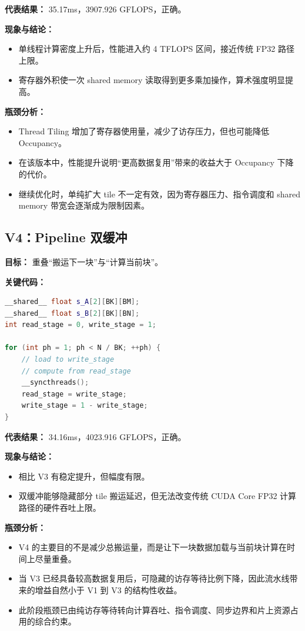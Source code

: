 \documentclass[12pt,a4paper]{ctexart}
\begin{document}
\textbf{代表结果：} 35.17ms，3907.926 GFLOPS，正确。

\textbf{现象与结论：}
\begin{itemize}[leftmargin=2em]
  \item 单线程计算密度上升后，性能进入约 4 TFLOPS 区间，接近传统 FP32 路径上限。
  \item 寄存器外积使一次 shared memory 读取得到更多乘加操作，算术强度明显提高。
\end{itemize}

\textbf{瓶颈分析：}
\begin{itemize}[leftmargin=2em]
  \item Thread Tiling 增加了寄存器使用量，减少了访存压力，但也可能降低 Occupancy。
  \item 在该版本中，性能提升说明“更高数据复用”带来的收益大于 Occupancy 下降的代价。
  \item 继续优化时，单纯扩大 tile 不一定有效，因为寄存器压力、指令调度和 shared memory 带宽会逐渐成为限制因素。
\end{itemize}

\subsection{V4：Pipeline 双缓冲}
\textbf{目标：} 重叠“搬运下一块”与“计算当前块”。

\textbf{关键代码：}
\begin{lstlisting}[language=C++]
__shared__ float s_A[2][BK][BM];
__shared__ float s_B[2][BK][BN];
int read_stage = 0, write_stage = 1;

for (int ph = 1; ph < N / BK; ++ph) {
    // load to write_stage
    // compute from read_stage
    __syncthreads();
    read_stage = write_stage;
    write_stage = 1 - write_stage;
}
\end{lstlisting}

\textbf{代表结果：} 34.16ms，4023.916 GFLOPS，正确。

\textbf{现象与结论：}
\begin{itemize}[leftmargin=2em]
  \item 相比 V3 有稳定提升，但幅度有限。
  \item 双缓冲能够隐藏部分 tile 搬运延迟，但无法改变传统 CUDA Core FP32 计算路径的硬件吞吐上限。
\end{itemize}

\textbf{瓶颈分析：}
\begin{itemize}[leftmargin=2em]
  \item V4 的主要目的不是减少总搬运量，而是让下一块数据加载与当前块计算在时间上尽量重叠。
  \item 当 V3 已经具备较高数据复用后，可隐藏的访存等待比例下降，因此流水线带来的增益自然小于 V1 到 V3 的结构性收益。
  \item 此阶段瓶颈已由纯访存等待转向计算吞吐、指令调度、同步边界和片上资源占用的综合约束。
\end{itemize}
\end{document}
